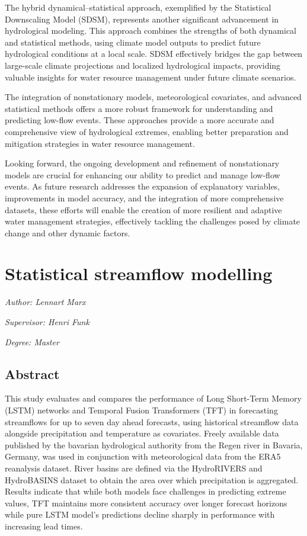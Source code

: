 \documentclass[
]{krantz}
\begin{document}
The hybrid dynamical--statistical approach, exemplified by the Statistical Downscaling Model (SDSM), represents another significant advancement in hydrological modeling. This approach combines the strengths of both dynamical and statistical methods, using climate model outputs to predict future hydrological conditions at a local scale. SDSM effectively bridges the gap between large-scale climate projections and localized hydrological impacts, providing valuable insights for water resource management under future climate scenarios.

The integration of nonstationary models, meteorological covariates, and advanced statistical methods offers a more robust framework for understanding and predicting low-flow events. These approaches provide a more accurate and comprehensive view of hydrological extremes, enabling better preparation and mitigation strategies in water resource management.

Looking forward, the ongoing development and refinement of nonstationary models are crucial for enhancing our ability to predict and manage low-flow events. As future research addresses the expansion of explanatory variables, improvements in model accuracy, and the integration of more comprehensive datasets, these efforts will enable the creation of more resilient and adaptive water management strategies, effectively tackling the challenges posed by climate change and other dynamic factors.

\chapter{Statistical streamflow modelling}\label{sm}

\emph{Author: Lennart Marx}

\emph{Supervisor: Henri Funk}

\emph{Degree: Master}

\section{Abstract}\label{abstract-3}

This study evaluates and compares the performance of Long Short-Term Memory (LSTM) networks and Temporal Fusion Transformers (TFT) in forecasting streamflows for up to seven day ahead forecasts, using historical streamflow data alongside precipitation and temperature as covariates. Freely available data published by the bavarian hydrological authority from the Regen river in Bavaria, Germany, was used in conjunction with meteorological data from the ERA5 reanalysis dataset. River basins are defined via the HydroRIVERS and HydroBASINS dataset to obtain the area over which precipitation is aggregated. Results indicate that while both models face challenges in predicting extreme values, TFT maintains more consistent accuracy over longer forecast horizons while pure LSTM model's predictions decline sharply in performance with increasing lead times.
\end{document}
